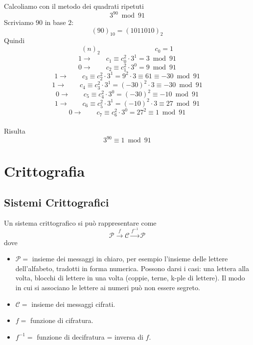 \documentclass[a4paper,12pt, oneside]{book}
\begin{document}
	\begin{shaded}
		\begin{esempio}
			Calcoliamo con il metodo dei quadrati ripetuti
			$$3^{90} \bmod 91$$
			Scriviamo $90$ in base $2$:
			$$(90)_{10} = (1011010)_2$$
			Quindi
			$$(n)_2 \qquad \qquad \qquad \qquad c_0 = 1$$
			$$1 \longrightarrow \qquad c_1 \equiv c_{0}^{2} \cdot 3^1 = 3 \bmod 91$$
			$$0 \longrightarrow \qquad c_2 \equiv c_{1}^{2} \cdot 3^0 = 9 \bmod 91$$
			$$1 \longrightarrow \qquad c_3 \equiv c_{2}^{2} \cdot 3^1 = 9^2 \cdot 3 \equiv 61 \equiv -30 \bmod 91$$
			$$1 \longrightarrow \qquad c_4 \equiv c_{3}^{2} \cdot 3^1 = (-30)^2 \cdot 3 \equiv -30 \bmod 91$$
			$$0 \longrightarrow \qquad c_5 \equiv c_{4}^{2} \cdot 3^0 = (-30)^2 \equiv -10 \bmod 91$$
			$$1 \longrightarrow \qquad c_6 \equiv c_{5}^{2} \cdot 3^1 = (-10)^2 \cdot 3 \equiv 27 \bmod 91$$
			$$0 \longrightarrow \qquad c_7 \equiv c_{6}^{2} \cdot 3^0 = 27^2 \equiv 1 \bmod 91$$\\
			Risulta $$3^{90} \equiv 1 \bmod 91$$
		\end{esempio}
	\end{shaded}

		
\chapter{Crittografia}
	\section{Sistemi Crittografici}
		Un sistema crittografico si può rappresentare come $$ \mathcal{P} \overset{\text{$f$}}{\longrightarrow} \mathcal{C} \overset{\text{$f^{-1}$}}{\longrightarrow} \mathcal{P} $$ 
		dove \begin{itemize}
			\item $\mathcal{P} = $ insieme dei messaggi in chiaro, per esempio l’insieme delle lettere dell'alfabeto, tradotti in forma numerica. Possono darsi i casi: una lettera alla volta, blocchi di lettere in una volta (coppie, terne, k-ple di lettere). Il modo in cui si associano le lettere ai numeri può non essere segreto.
			\item $\mathcal{C} = $ insieme dei messaggi cifrati.
			\item $f= $ funzione di cifratura.
			\item $f^{-1} = $ funzione di decifratura = inversa di $f$.
		\end{itemize}
	
\end{document}
